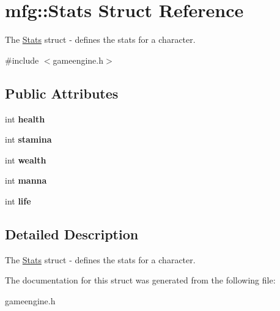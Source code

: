 \hypertarget{structmfg_1_1_stats}{}\section{mfg\+:\+:Stats Struct Reference}
\label{structmfg_1_1_stats}


The \hyperlink{structmfg_1_1_stats}{Stats} struct -\/ defines the stats for a character.  




{\ttfamily \#include $<$gameengine.\+h$>$}

\subsection*{Public Attributes}
\begin{DoxyCompactItemize}
\item 
\mbox{\label{structmfg_1_1_stats_a1170cdacbc82425eb2801a1220582da3}} 
int {\bfseries health}
\item 
\mbox{\label{structmfg_1_1_stats_aa4a344305e9e1eb4e7ac617c538c3bf1}} 
int {\bfseries stamina}
\item 
\mbox{\label{structmfg_1_1_stats_adc3325405ac0550c7017eb2a369d7c86}} 
int {\bfseries wealth}
\item 
\mbox{\label{structmfg_1_1_stats_adf21a6f756e7cbabb974d5395ada1b89}} 
int {\bfseries manna}
\item 
\mbox{\label{structmfg_1_1_stats_a78e5181b5830ceb7c4c71b32b59578c8}} 
int {\bfseries life}
\end{DoxyCompactItemize}


\subsection{Detailed Description}
The \hyperlink{structmfg_1_1_stats}{Stats} struct -\/ defines the stats for a character. 

The documentation for this struct was generated from the following file\+:\begin{DoxyCompactItemize}
\item 
gameengine.\+h\end{DoxyCompactItemize}
